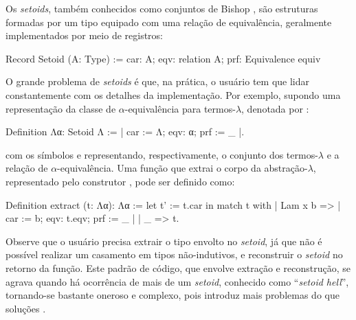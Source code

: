 Os \textit{setoids}, também conhecidos como conjuntos de Bishop \cite{Barthe2003,Bishop2012}, são estruturas formadas por um tipo equipado com uma relação de equivalência, geralmente implementados por meio de registros:
\begin{coqcode}
Record Setoid (A: Type) := {
   car: A; 
   eqv: relation A; 
   prf: Equivalence equiv
}
\end{coqcode}
O grande problema de \textit{setoids} é que, na prática, o usuário tem que lidar constantemente com os detalhes da implementação. Por exemplo, supondo uma representação da classe de $\alpha$-equivalência para termos-$\lambda$, denotada por :
\begin{coqcode}
Definition Λα: Setoid Λ := {| car := Λ; eqv: α; prf := _ |}.
\end{coqcode}
com os símbolos  e  representando, respectivamente, o conjunto dos termos-$\lambda$ e a relação de $\alpha$-equivalência. 
Uma função que extrai o corpo da abstração-$\lambda$, representado pelo construtor , pode ser definido como:
\begin{coqcode}
Definition extract (t: Λα): Λα :=
   let t' := t.car in
   match t with
   | Lam x b => {| car := b; eqv: t.eqv; prf := _ |}
   | _ => t.
\end{coqcode}
Observe que o usuário precisa extrair o tipo envolto no \textit{setoid}, já que não é possível realizar um casamento em tipos não-indutivos, e reconstruir o \textit{setoid} no retorno da função. Este padrão de código, que envolve extração e reconstrução, se agrava quando há ocorrência de mais de um \textit{setoid}, conhecido como ``\textit{setoid hell}'', tornando-se bastante oneroso e complexo, pois introduz mais problemas do que soluções \cite{Altenkirch2017}.

